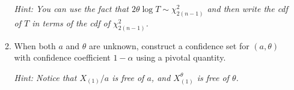 \documentclass[12pt]{extarticle}
\begin{document}
\begin{enumerate}
\begin{enumerate}
		\textit{Hint: You can use the fact that $2\theta\log T \sim \chi_{2(n-1)}^2$ and then write the cdf of $T$ in terms of the cdf of $\chi_{2(n-1)}^2$.}
		
		\item When both $a$ and $\theta$ are unknown, construct a confidence set for $(a, \theta)$ with confidence coefficient $1 - \alpha$ using a pivotal quantity.
		
		\textit{Hint: Notice that $X_{(1)}/a$ is free of $a$, and $X_{(1)}^\theta$ is free of $\theta$.}
	\end{enumerate}
	
	
\end{enumerate}
\end{document}
